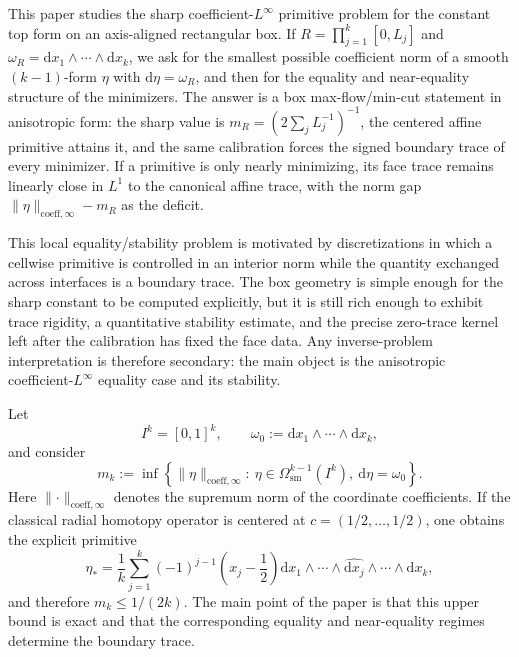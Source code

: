 \documentclass[11pt,letterpaper]{article}
\numberwithin{equation}{section}
\theoremstyle{plain}
\theoremstyle{definition}
\theoremstyle{remark}
\newcommand{\dd}{\mathrm{d}}
\newcommand{\norm}[1]{\lVert #1 \rVert}
\newcommand{\coeff}{\mathrm{coeff}}
\begin{document}
This paper studies the sharp coefficient-$L^\infty$ primitive problem for the
constant top form on an axis-aligned rectangular box.  If
$R=\prod_{j=1}^k[0,L_j]$ and $\omega_R=\dd x_1\wedge\cdots\wedge\dd x_k$, we
ask for the smallest possible coefficient norm of a smooth $(k-1)$-form
$\eta$ with $\dd\eta=\omega_R$, and then for the equality and near-equality
structure of the minimizers.  The answer is a box max-flow/min-cut statement in
anisotropic form: the sharp value is
$m_R=(2\sum_jL_j^{-1})^{-1}$, the centered affine primitive attains it, and
the same calibration forces the signed boundary trace of every minimizer.  If a
primitive is only nearly minimizing, its face trace remains linearly close in
$L^1$ to the canonical affine trace, with the norm gap
$\norm{\eta}_{\coeff,\infty}-m_R$ as the deficit.

This local equality/stability problem is motivated by discretizations in which
a cellwise primitive is controlled in an interior norm while the quantity
exchanged across interfaces is a boundary trace.  The box geometry is simple
enough for the sharp constant to be computed explicitly, but it is still rich
enough to exhibit trace rigidity, a quantitative stability estimate, and the
precise zero-trace kernel left after the calibration has fixed the face data.
Any inverse-problem interpretation is therefore secondary: the main object is
the anisotropic coefficient-$L^\infty$ equality case and its stability.

Let
\[
I^k=[0,1]^k,
\qquad
\omega_0:=\dd x_1\wedge\cdots\wedge \dd x_k,
\]
and consider
\begin{equation}
\label{eq:intro-extremal-problem}
m_k:=
\inf\left\{
\norm{\eta}_{\coeff,\infty}:\ \eta\in\Omega^{k-1}_{\mathrm{sm}}(I^k),\
\dd\eta=\omega_0
\right\}.
\end{equation}
Here $\norm{\cdot}_{\coeff,\infty}$ denotes the supremum norm of the coordinate
coefficients. If the classical radial homotopy operator is centered at
$c=(1/2,\dots,1/2)$, one obtains the explicit primitive
\begin{equation}
\label{eq:intro-explicit-minimizer}
\eta_\ast
=
\frac{1}{k}\sum_{j=1}^k (-1)^{j-1}\left(x_j-\frac12\right)
\dd x_1\wedge\cdots\wedge\widehat{\dd x_j}\wedge\cdots\wedge \dd x_k,
\end{equation}
and therefore $m_k\le 1/(2k)$. The main point of the paper is that this upper
bound is exact and that the corresponding equality and near-equality regimes
determine the boundary trace.
\end{document}
